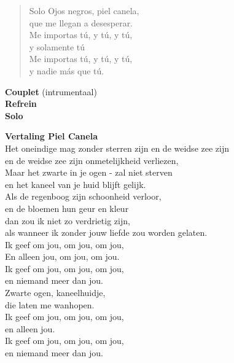 \begin{verse}{Solo}
  Ojos negros, piel canela,
  \\
  que me llegan a desesperar.
  \\
  Me importas t\'{u}, y t\'{u}, y t\'{u},
  \\
  y solamente t\'{u}\hspace{2em}\hspace{2em}
  \\
  Me importas t\'{u}, y t\'{u}, y t\'{u},
  \\
  y nadie m\'{a}s que t\'{u}.
\end{verse}

\textbf{Couplet} (intrumentaal)\\
\textbf{Refrein}\\
\textbf{Solo}

\textbf{Vertaling Piel Canela}\\
Het oneindige mag zonder sterren zijn en de weidse zee zijn\\
en de weidse zee zijn onmetelijkheid verliezen,\\
Maar het zwarte in je ogen - zal niet sterven\\
en het kaneel van je huid blijft gelijk.\\
\vspace*{1\baselineskip}
Als de regenboog zijn schoonheid verloor,\\
en de bloemen hun geur en kleur\\
dan zou ik niet zo verdrietig zijn,\\
als wanneer ik zonder jouw liefde zou worden gelaten.\\
Ik geef om jou, om jou, om jou,\\
En alleen jou, om jou, om jou.\\
Ik geef om jou, om jou, om jou,\\
en niemand meer dan jou.\\
\vspace*{1\baselineskip}
Zwarte ogen, kaneelhuidje,\\
die laten me wanhopen.\\
Ik geef om jou, om jou, om jou,\\
en alleen jou.\\
Ik geef om jou, om jou, om jou,\\
en niemand meer dan jou. 
